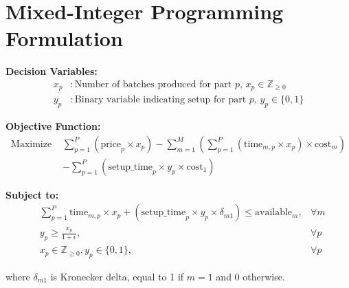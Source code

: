 \documentclass{article}
\begin{document}
\section*{Mixed-Integer Programming Formulation}

\textbf{Decision Variables:}
\begin{align*}
x_p & : \text{Number of batches produced for part } p, \, x_p \in \mathbb{Z}_{\geq 0} \\
y_p & : \text{Binary variable indicating setup for part } p, \, y_p \in \{0, 1\}
\end{align*}

\textbf{Objective Function:}
\begin{align*}
\text{Maximize } & \sum_{p=1}^{P} \left( \text{price}_p \times x_p \right) - 
\sum_{m=1}^{M} \left( \sum_{p=1}^{P} \left( \text{time}_{m,p} \times x_p \right) \times \text{cost}_m \right)\\
& - \sum_{p=1}^{P} \left( \text{setup\_time}_p \times y_p \times \text{cost}_1 \right)
\end{align*}

\textbf{Subject to:}
\begin{align*}
& \sum_{p=1}^{P} \text{time}_{m,p} \times x_p + (\text{setup\_time}_p \times y_p \times \delta_{m1}) \leq \text{available}_m, & \forall m \\
& y_p \geq \frac{x_p}{1 + \epsilon}, & \forall p \\
& x_p \in \mathbb{Z}_{\geq 0}, y_p \in \{0, 1\}, & \forall p
\end{align*}

\noindent where \( \delta_{m1} \) is Kronecker delta, equal to 1 if \( m = 1 \) and 0 otherwise.
\end{document}
